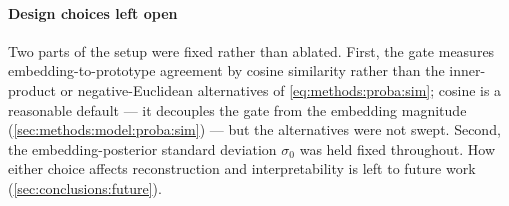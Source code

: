 %

\paragraph{Design choices left open} Two parts of the setup were fixed rather
than ablated. First, the gate measures embedding-to-prototype agreement by
cosine similarity rather than the inner-product or negative-Euclidean
alternatives of \cref{eq:methods:proba:sim}; cosine is a
reasonable default --- it decouples the gate from the embedding magnitude
(\cref{sec:methods:model:proba:sim}) ---
but the alternatives were not swept. Second, the embedding-posterior standard
deviation $\sigma_{0}$ was held fixed throughout. How either choice affects
reconstruction and interpretability is left to future work
(\cref{sec:conclusions:future}).

